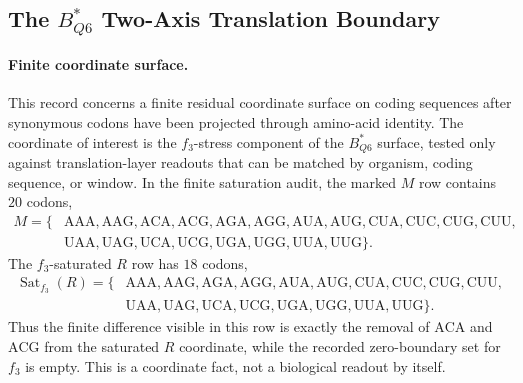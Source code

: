 
\subsection{The $B^*_{Q6}$ Two-Axis Translation Boundary}
\label{sec:bioreality-q6-f3-two-axis-translation-boundary}

\paragraph{Finite coordinate surface.}
This record concerns a finite residual coordinate surface on coding sequences after synonymous codons have been projected through amino-acid identity.  The coordinate of interest is the $f_3$-stress component of the $B^*_{Q6}$ surface, tested only against translation-layer readouts that can be matched by organism, coding sequence, or window.  In the finite saturation audit, the marked $M$ row contains $20$ codons,
$$
\begin{aligned}
M = \{&\mathrm{AAA},\mathrm{AAG},\mathrm{ACA},\mathrm{ACG},\mathrm{AGA},\mathrm{AGG},\mathrm{AUA},\mathrm{AUG},\mathrm{CUA},\mathrm{CUC},\mathrm{CUG},\mathrm{CUU},\\
&\mathrm{UAA},\mathrm{UAG},\mathrm{UCA},\mathrm{UCG},\mathrm{UGA},\mathrm{UGG},\mathrm{UUA},\mathrm{UUG}\}.
\end{aligned}
$$
The $f_3$-saturated $R$ row has $18$ codons,
$$
\begin{aligned}
\operatorname{Sat}_{f_3}(R)=\{&\mathrm{AAA},\mathrm{AAG},\mathrm{AGA},\mathrm{AGG},\mathrm{AUA},\mathrm{AUG},\mathrm{CUA},\mathrm{CUC},\mathrm{CUG},\mathrm{CUU},\\
&\mathrm{UAA},\mathrm{UAG},\mathrm{UCA},\mathrm{UCG},\mathrm{UGA},\mathrm{UGG},\mathrm{UUA},\mathrm{UUG}\}.
\end{aligned}
$$
Thus the finite difference visible in this row is exactly the removal of $\mathrm{ACA}$ and $\mathrm{ACG}$ from the saturated $R$ coordinate, while the recorded zero-boundary set for $f_3$ is empty.  This is a coordinate fact, not a biological readout by itself.

